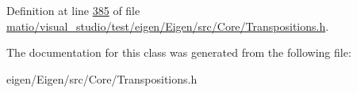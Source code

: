 Definition at line \hyperlink{matio_2visual__studio_2test_2eigen_2_eigen_2src_2_core_2_transpositions_8h_source_l00385}{385} of file \hyperlink{matio_2visual__studio_2test_2eigen_2_eigen_2src_2_core_2_transpositions_8h_source}{matio/visual\+\_\+studio/test/eigen/\+Eigen/src/\+Core/\+Transpositions.\+h}.



The documentation for this class was generated from the following file\+:\begin{DoxyCompactItemize}
\item 
eigen/\+Eigen/src/\+Core/\+Transpositions.\+h\end{DoxyCompactItemize}
